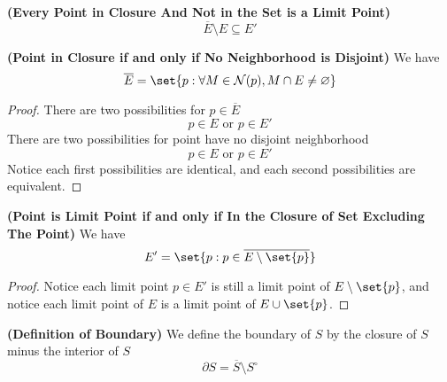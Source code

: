 \documentclass{report}
\begin{document}
\begin{corollary}
\label{2.2.8}
\textbf{(Every Point in Closure And Not in the Set is a Limit Point)}
\begin{equation*}
\overline{E}\setminus E\subseteq E'
\end{equation*}
\end{corollary}
\begin{theorem}
\label{2.2.9}
\textbf{(Point in Closure if and only if No Neighborhood is Disjoint)} We have
\begin{equation*}
\overline{E}=\set{p: \forall M\in \mathcal{N}(p), M\cap E\neq \varnothing}
\end{equation*}
\end{theorem}
\begin{proof}
  There are two possibilities for $p\in \overline{E}$
  \begin{equation*}
  p\in E\text{ or }p\in E'
  \end{equation*}
  There are two possibilities for point have no disjoint neighborhood
  \begin{equation*}
  p\in E\text{ or }p\in E'
  \end{equation*}
  Notice each first possibilities are identical, and each second possibilities are equivalent.
\end{proof}
\begin{theorem}
\label{2.2.10}
\textbf{(Point is Limit Point if and only if In the Closure of Set Excluding The Point)} We have  
\begin{equation*}
E'=\set{p:p \in \overline{E\setminus \set{p}}}
\end{equation*}
\end{theorem}
\begin{proof}
  Notice each limit point $p\in  E'$ is still a limit point of $E\setminus \set{p}$, and notice each limit point of  $E$ is a limit point of $E\cup \set{p}$.
\end{proof}
\begin{definition}
\label{2.2.11}
\textbf{(Definition of Boundary)} We define the boundary of $S$ by the closure of $S$ minus the interior of  $S$
 \begin{equation*}
\partial S=\overline{S}\setminus S^\circ 
\end{equation*}
\end{definition}
\end{document}
